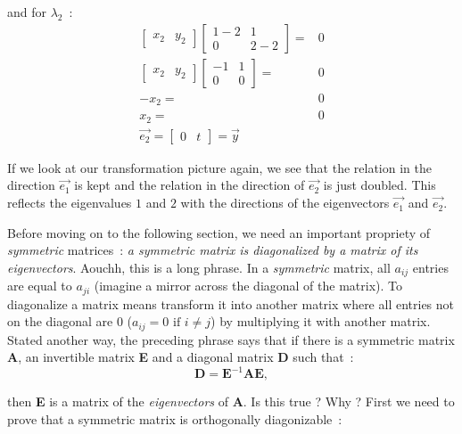 \documentclass[11pt,twocolumn]{amsart} %
\begin{document}
and for $\lambda_2$~:
\begin{align*}
  \begin{bmatrix} x_2 & y_2 \end{bmatrix} \begin{bmatrix} 1-2 & 1 \\ 0 & 2-2 \end{bmatrix} = & 0 \\
  \begin{bmatrix} x_2 & y_2 \end{bmatrix} \begin{bmatrix} -1 & 1 \\ 0 & 0 \end{bmatrix} = & 0 \\
  -x_2  = & 0 \\
   x_2  = & 0 \\
  \vec{e_2} = \begin{bmatrix} 0 & t \end{bmatrix} = \vec{y}
\end{align*}

If we look at our transformation picture again, we see that the relation in the direction $\vec{e_1}$ is kept and the relation in the direction of $\vec{e_2}$ is just doubled. This reflects the eigenvalues $1$ and $2$ with the directions of the eigenvectors $\vec{e_1}$ and $\vec{e_2}$.

Before moving on to the following section, we need an important propriety of \emph{symmetric} matrices~: \emph{a symmetric matrix is diagonalized by a matrix of its eigenvectors}. Aouchh, this is a long phrase. In a \emph{symmetric} matrix, all $a_{ij}$ entries are equal to $a_{ji}$ (imagine a mirror across the diagonal of the matrix). To diagonalize a matrix means transform it into another matrix where all entries not on the diagonal are 0 ($a_{ij} = 0\text{ if } i \not= j$) by multiplying it with another matrix. Stated another way, the preceding phrase says that if there is a symmetric matrix \textbf{A}, an invertible matrix \textbf{E} and a diagonal matrix \textbf{D} such that~:
\begin{equation*}
  \textbf{D} = \textbf{E}^{-1}\textbf{A}\textbf{E},
\end{equation*}

then \textbf{E} is a matrix of the \emph{eigenvectors} of \textbf{A}. Is this true ? Why ? First we need to prove that a symmetric matrix is orthogonally diagonizable~:
\begin{equation*}
  
\end{equation*}
\end{document}
